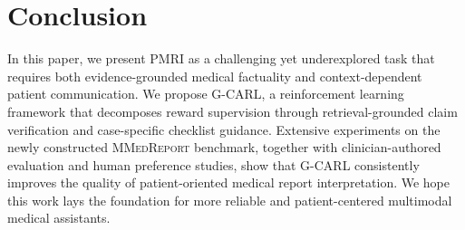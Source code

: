 \documentclass[letterpaper]{article} %
\begin{document}
\section{Conclusion}
In this paper, we present PMRI as a challenging yet underexplored task that requires both evidence-grounded medical factuality and context-dependent patient communication. We propose G-CARL, a reinforcement learning framework that decomposes reward supervision through retrieval-grounded claim verification and case-specific checklist guidance. Extensive experiments on the newly constructed \textsc{MMedReport} benchmark, together with clinician-authored evaluation and human preference studies, show that G-CARL consistently improves the quality of patient-oriented medical report interpretation. We hope this work lays the foundation for more reliable and patient-centered multimodal medical assistants.




% 
\end{document}
